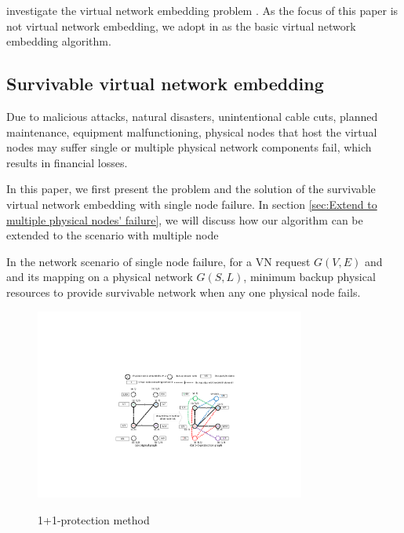  investigate the virtual network embedding problem \cite{fischer2013virtual}. As the focus of this paper is not  virtual network embedding, we adopt  in \cite{liu2011completing} as the basic virtual network embedding algorithm. 


\subsection{Survivable virtual network embedding}
Due to malicious attacks, natural disasters, unintentional cable cuts, planned maintenance, equipment malfunctioning, physical nodes that host the virtual nodes may suffer  single or multiple physical network components fail, which results in financial losses.


In this paper, we first present the problem and the solution of  the survivable virtual network embedding  with single node failure. In section \ref{sec:Extend to multiple physical nodes' failure}, we will discuss how our algorithm can be extended to the scenario with multiple node 


In the network scenario of  single node failure, for a VN request $G (V,E)$ and and its mapping on a physical network $G (S,L)$,   minimum backup physical resources to  provide survivable network  when any one physical node fails.

\begin{figure}
\centering
\includegraphics[width=3.5in]{Fig/One2OneProtection}\\
\caption{1+1-protection method}\label{fig:One2OneProtection}
\end{figure}

